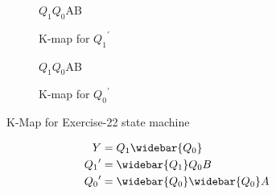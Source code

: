 \documentclass[11pt]{article}
\begin{document}
\begin{figure}[h!]
	\begin{subfigure}{.5\textwidth}
		\centering
		\begin{Karnaugh}{$Q_1$$Q_0$}{AB}
		\end{Karnaugh}
		\caption{K-map for ${Q_1}^{\prime}$}
		\label{fig:sop}
	\end{subfigure}
	\begin{subfigure}{.5\textwidth}
		\centering
		\begin{Karnaugh}{$Q_1$$Q_0$}{AB}
		\end{Karnaugh}
		\caption{K-map for ${Q_0}^{\prime}$}
		\label{fig:pos}
	\end{subfigure}
	
	
	
	\caption{K-Map for Exercise-22 state machine}
	\label{fig:kmap}
\end{figure}

\begin{align*}
Y &= Q_1\widebar{Q_0}\\
{Q_1}^{\prime} &= \widebar{Q_1}Q_0B\\
{Q_0}^{\prime} &= \widebar{Q_0}\widebar{Q_0}A
\end{align*}
\end{document}

